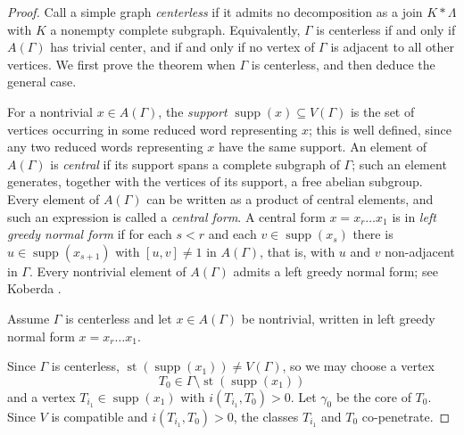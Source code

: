 \documentclass[12pt,a4paper]{amsart}
\numberwithin{equation}{section}
\theoremstyle{plain}
\theoremstyle{definition}
\theoremstyle{remark}
\begin{document}
\begin{proof}
    Call a simple graph \emph{centerless} if it admits no decomposition as a join $K * \Lambda$ with $K$ a nonempty complete subgraph.
    Equivalently, $\Gamma$ is centerless if and only if $A(\Gamma)$ has trivial center, and if and only if no vertex of $\Gamma$ is adjacent to all other vertices.
    We first prove the theorem when $\Gamma$ is centerless, and then deduce the general case.
    
    For a nontrivial $x \in A(\Gamma)$, the \emph{support} $\operatorname{supp}(x) \subseteq V(\Gamma)$ is the set of vertices occurring in some reduced word representing $x$; this is well defined, since any two reduced words representing $x$ have the same support.
    An element of $A(\Gamma)$ is \emph{central} if its support spans a complete subgraph of $\Gamma$; such an element generates, together with the vertices of its support, a free abelian subgroup.
    Every element of $A(\Gamma)$ can be written as a product of central elements, and such an expression is called a \emph{central form}.
    A central form $x = x_r \dots x_1$ is in \emph{left greedy normal form} if for each $s < r$ and each $v \in \operatorname{supp}(x_s)$ there is $u \in \operatorname{supp}(x_{s+1})$ with $[u, v] \ne 1$ in $A(\Gamma)$, that is, with $u$ and $v$ non-adjacent in $\Gamma$.
    Every nontrivial element of $A(\Gamma)$ admits a left greedy normal form; see Koberda \cite{MR3000498}.
    
    Assume $\Gamma$ is centerless and let $x \in A(\Gamma)$ be nontrivial, written in left greedy normal form $x = x_r \dots x_1$.

    Since $\Gamma$ is centerless, $\operatorname{st}(\operatorname{supp}(x_1)) \ne V(\Gamma)$, so we may choose a vertex
    \[
        T_0 \in \Gamma \setminus \operatorname{st}(\operatorname{supp}(x_1))
    \]
    and a vertex $T_{i_1} \in \operatorname{supp}(x_1)$ with $i(T_{i_1}, T_0) > 0$.
    Let $\gamma_0$ be the core of $T_0$.
    Since $V$ is compatible and $i(T_{i_1}, T_0) > 0$, the classes $T_{i_1}$ and $T_0$ co-penetrate.


\end{proof}
\end{document}
